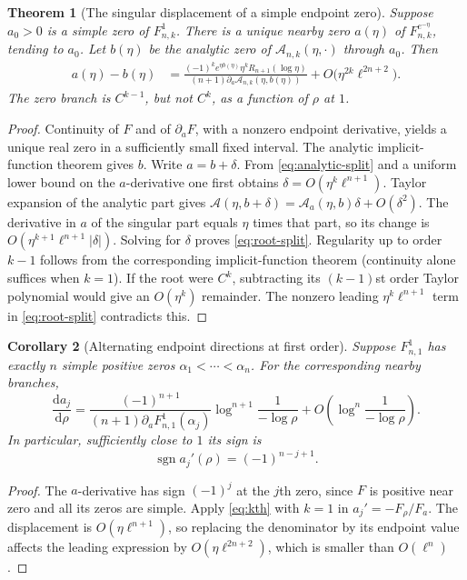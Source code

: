 \documentclass[11pt,letterpaper]{article}
\numberwithin{equation}{section}
\newtheorem{theorem}{Theorem}[section]
\newtheorem{corollary}[theorem]{Corollary}
\theoremstyle{definition}\newtheorem{definition}[theorem]{Definition}
\theoremstyle{remark}\newtheorem{remark}[theorem]{Remark}
\DeclareMathOperator{\sgn}{sgn}
\newcommand{\F}[3]{F_{#1,#2}^{#3}}
\begin{document}
\begin{theorem}[The singular displacement of a simple endpoint zero]\label{thm:rootregularity}
Suppose $a_0>0$ is a simple zero of $\F nk1$. There is a unique nearby zero $a(\eta)$ of $\F nk{e^{-\eta}}$, tending to $a_0$. Let $b(\eta)$ be the analytic zero of $\mathcal A_{n,k}(\eta,\cdot)$ through $a_0$. Then
\begin{align}\label{eq:root-split}
 a(\eta)-b(\eta)
 &=\frac{(-1)^k e^{\eta b(\eta)}\eta^k R_{n+1}(\log\eta)}
 {(n+1)\partial_a\mathcal A_{n,k}(\eta,b(\eta))}
 +O\bigl(\eta^{2k}\ell^{2n+2}\bigr).
\end{align}
The zero branch is $C^{k-1}$, but not $C^k$, as a function of $\rho$ at $1$.
\end{theorem}
\begin{proof}
Continuity of $F$ and of $\partial_aF$, with a nonzero endpoint derivative, yields a unique real zero in a sufficiently small fixed interval. The analytic implicit-function theorem gives $b$. Write $a=b+\delta$. From \eqref{eq:analytic-split} and a uniform lower bound on the $a$-derivative one first obtains $\delta=O(\eta^k\ell^{n+1})$. Taylor expansion of the analytic part gives $\mathcal A(\eta,b+\delta)=\mathcal A_a(\eta,b)\delta+O(\delta^2)$. The derivative in $a$ of the singular part equals $\eta$ times that part, so its change is $O(\eta^{k+1}\ell^{n+1}|\delta|)$. Solving for $\delta$ proves \eqref{eq:root-split}. Regularity up to order $k-1$ follows from the corresponding implicit-function theorem (continuity alone suffices when $k=1$). If the root were $C^k$, subtracting its $(k-1)$st order Taylor polynomial would give an $O(\eta^k)$ remainder. The nonzero leading $\eta^k\ell^{n+1}$ term in \eqref{eq:root-split} contradicts this.
\end{proof}

\begin{corollary}[Alternating endpoint directions at first order]\label{cor:alternating}
Suppose $\F n1{1}$ has exactly $n$ simple positive zeros $\alpha_1<\cdots<\alpha_n$. For the corresponding nearby branches,
\begin{equation}\label{eq:direction-asympt}
 \frac{\mathrm d a_j}{\mathrm d\rho}
 =\frac{(-1)^{n+1}}{(n+1)\partial_a\F n1{1}(\alpha_j)}
   \log^{n+1}\frac1{-\log\rho}
 +O\left(\log^n\frac1{-\log\rho}\right).
\end{equation}
In particular, sufficiently close to $1$ its sign is
\begin{equation}\label{eq:direction}
 \sgn a_j'(\rho)=(-1)^{n-j+1}.
\end{equation}
\end{corollary}
\begin{proof}
The $a$-derivative has sign $(-1)^j$ at the $j$th zero, since $F$ is positive near zero and all its zeros are simple. Apply \eqref{eq:kth} with $k=1$ in $a_j'=-F_\rho/F_a$. The displacement is $O(\eta\ell^{n+1})$, so replacing the denominator by its endpoint value affects the leading expression by $O(\eta\ell^{2n+2})$, which is smaller than $O(\ell^n)$.
\end{proof}
\end{document}
